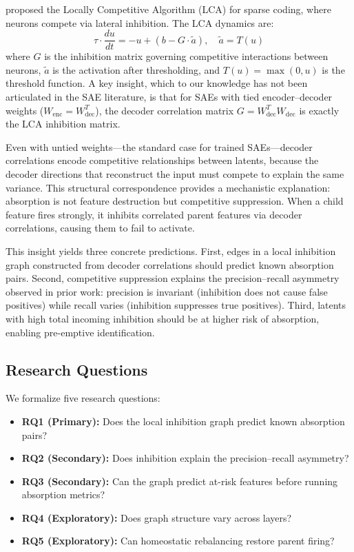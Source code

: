 \documentclass{article}
\begin{document}
\citet{rozell2008sparse} proposed the Locally Competitive Algorithm (LCA) for sparse coding, where neurons compete via lateral inhibition. The LCA dynamics are:
\begin{equation}
\tau \cdot \frac{du}{dt} = -u + (b - G \cdot \tilde{a}), \quad \tilde{a} = T(u)
\end{equation}
where $G$ is the inhibition matrix governing competitive interactions between neurons, $\tilde{a}$ is the activation after thresholding, and $T(u) = \max(0, u)$ is the threshold function. A key insight, which to our knowledge has not been articulated in the SAE literature, is that for SAEs with tied encoder--decoder weights ($W_{\text{enc}} = W_{\text{dec}}^T$), the decoder correlation matrix $G = W_{\text{dec}}^T W_{\text{dec}}$ is exactly the LCA inhibition matrix.

Even with untied weights---the standard case for trained SAEs---decoder correlations encode competitive relationships between latents, because the decoder directions that reconstruct the input must compete to explain the same variance. This structural correspondence provides a mechanistic explanation: absorption is not feature destruction but competitive suppression. When a child feature fires strongly, it inhibits correlated parent features via decoder correlations, causing them to fail to activate.

This insight yields three concrete predictions. First, edges in a local inhibition graph constructed from decoder correlations should predict known absorption pairs. Second, competitive suppression explains the precision--recall asymmetry observed in prior work: precision is invariant (inhibition does not cause false positives) while recall varies (inhibition suppresses true positives). Third, latents with high total incoming inhibition should be at higher risk of absorption, enabling pre-emptive identification.

\subsection{Research Questions}

We formalize five research questions:
\begin{itemize}
    \item \textbf{RQ1 (Primary):} Does the local inhibition graph predict known absorption pairs?
    \item \textbf{RQ2 (Secondary):} Does inhibition explain the precision--recall asymmetry?
    \item \textbf{RQ3 (Secondary):} Can the graph predict at-risk features before running absorption metrics?
    \item \textbf{RQ4 (Exploratory):} Does graph structure vary across layers?
    \item \textbf{RQ5 (Exploratory):} Can homeostatic rebalancing restore parent firing?
\end{itemize}
\end{document}
